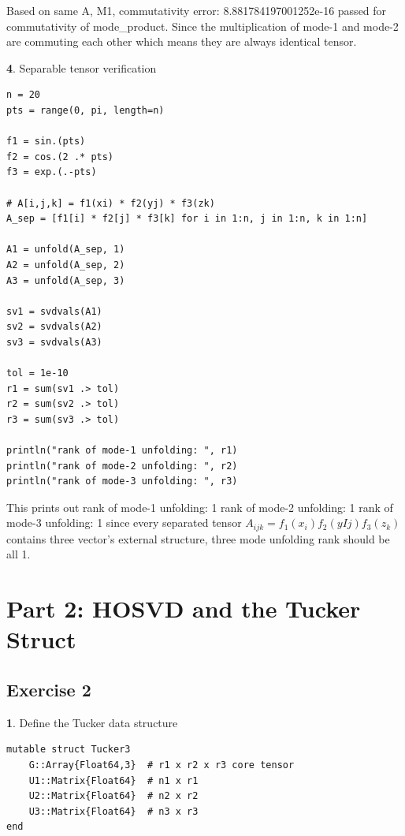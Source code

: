 \documentclass[11pt]{article}
\begin{document}
Based on same A, M1, commutativity error: 8.881784197001252e-16
passed for commutativity of mode\_product. Since the multiplication of mode-1 and mode-2 are commuting each other which means they are always identical tensor.

\vspace{1.5em}

\textbf{4}. Separable tensor verification

\begin{lstlisting}
n = 20
pts = range(0, pi, length=n)

f1 = sin.(pts)
f2 = cos.(2 .* pts)
f3 = exp.(.-pts)

# A[i,j,k] = f1(xi) * f2(yj) * f3(zk)
A_sep = [f1[i] * f2[j] * f3[k] for i in 1:n, j in 1:n, k in 1:n]

A1 = unfold(A_sep, 1)
A2 = unfold(A_sep, 2)
A3 = unfold(A_sep, 3)

sv1 = svdvals(A1)
sv2 = svdvals(A2)
sv3 = svdvals(A3)

tol = 1e-10
r1 = sum(sv1 .> tol)
r2 = sum(sv2 .> tol)
r3 = sum(sv3 .> tol)

println("rank of mode-1 unfolding: ", r1)
println("rank of mode-2 unfolding: ", r2)
println("rank of mode-3 unfolding: ", r3)
\end{lstlisting}

This prints out rank of mode-1 unfolding: 1
rank of mode-2 unfolding: 1
rank of mode-3 unfolding: 1 since every separated tensor $A_{ijk} = f_1(x_i)f_2(yIj)f_3(z_k)$ contains three vector's external structure, three mode unfolding rank should be all 1. 

\section*{Part 2:  HOSVD and the Tucker Struct}
\subsection*{Exercise 2}
\textbf{1}. Define the Tucker data structure

\begin{lstlisting}
mutable struct Tucker3
    G::Array{Float64,3}  # r1 x r2 x r3 core tensor
    U1::Matrix{Float64}  # n1 x r1
    U2::Matrix{Float64}  # n2 x r2
    U3::Matrix{Float64}  # n3 x r3
end
\end{lstlisting}
\end{document}
